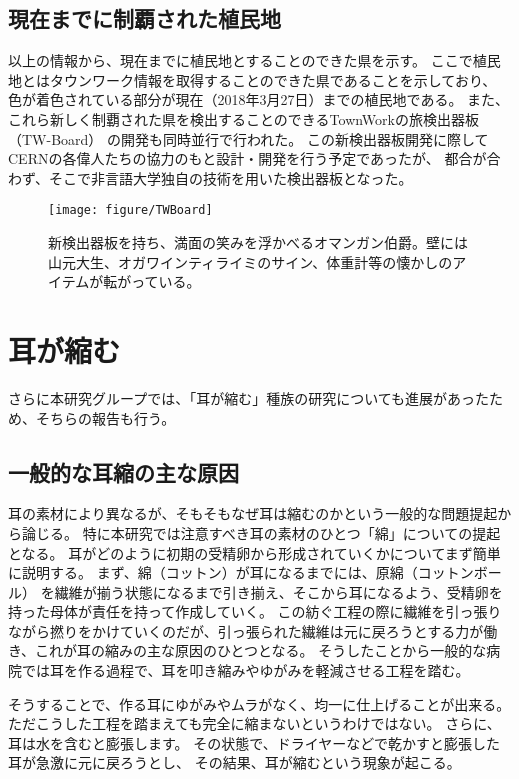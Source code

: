 \documentclass[12pt]{jsarticle}
\begin{document}
\newpage
\clearpage
\subsection{現在までに制覇された植民地}
以上の情報から、現在までに植民地とすることのできた県を示す。
ここで植民地とはタウンワーク情報を取得することのできた県であることを示しており、
色が着色されている部分が現在（2018年3月27日）までの植民地である。
また、これら新しく制覇された県を検出することのできるTownWorkの旅検出器板（TW-Board）
の開発も同時並行で行われた。
この新検出器板開発に際してCERNの各偉人たちの協力のもと設計・開発を行う予定であったが、
都合が合わず、そこで非言語大学独自の技術を用いた検出器板となった。

\begin{figure}
\centering
\texttt{[image: figure/TWBoard]}
\caption{新検出器板を持ち、満面の笑みを浮かべるオマンガン伯爵。壁には山元大生、オガワインティライミのサイン、体重計等の懐かしのアイテムが転がっている。}
\label{oyayubi}
\end{figure}

\newpage
\clearpage
\section{耳が縮む}
さらに本研究グループでは、「耳が縮む」種族の研究についても進展があったため、そちらの報告も行う。

\subsection{一般的な耳縮の主な原因}
耳の素材により異なるが、そもそもなぜ耳は縮むのかという一般的な問題提起から論じる。
特に本研究では注意すべき耳の素材のひとつ「綿」についての提起となる。
耳がどのように初期の受精卵から形成されていくかについてまず簡単に説明する。
まず、綿（コットン）が耳になるまでには、原綿（コットンボール） を繊維が揃う状態になるまで引き揃え、そこから耳になるよう、受精卵を持った母体が責任を持って作成していく。
この紡ぐ工程の際に繊維を引っ張りながら撚りをかけていくのだが、引っ張られた繊維は元に戻ろうとする力が働き、これが耳の縮みの主な原因のひとつとなる。
そうしたことから一般的な病院では耳を作る過程で、耳を叩き縮みやゆがみを軽減させる工程を踏む。\par

そうすることで、作る耳にゆがみやムラがなく、均一に仕上げることが出来る。
ただこうした工程を踏まえても完全に縮まないというわけではない。
さらに、耳は水を含むと膨張します。
その状態で、ドライヤーなどで乾かすと膨張した耳が急激に元に戻ろうとし、
その結果、耳が縮むという現象が起こる。
\end{document}
